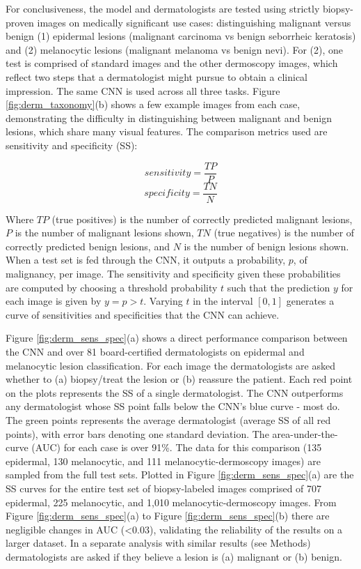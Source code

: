 For conclusiveness, the model and dermatologists are tested using strictly biopsy-proven images on medically significant use cases: distinguishing malignant versus benign (1) epidermal lesions (malignant carcinoma vs benign seborrheic keratosis) and (2) melanocytic lesions (malignant melanoma vs benign nevi). For (2), one test is comprised of standard images and the other dermoscopy images, which reflect two steps that a dermatologist might pursue to obtain a clinical impression. The same CNN is used across all three tasks. Figure \ref{fig:derm_taxonomy}(b) shows a few example images from each case, demonstrating the difficulty in distinguishing between malignant and benign lesions, which share many visual features. The comparison metrics used are sensitivity and specificity (SS):

$$sensitivity = \frac{TP}{P}$$
$$specificity = \frac{TN}{N}$$

Where $TP$ (true positives) is the number of correctly predicted malignant lesions, $P$ is the number of malignant lesions shown, $TN$ (true negatives) is the number of correctly predicted benign lesions, and $N$ is the number of benign lesions shown. When a test set is fed through the CNN, it outputs a probability, $p$, of malignancy, per image. The sensitivity and specificity given these probabilities are computed by choosing a threshold probability $t$ such that the prediction $y$ for each image is given by $y = p > t$. Varying $t$ in the interval $[0,1]$ generates a curve of sensitivities and specificities that the CNN can achieve.

Figure \ref{fig:derm_sens_spec}(a) shows a direct performance comparison between the CNN and over 81 board-certified dermatologists on epidermal and melanocytic lesion classification. For each image the dermatologists are asked whether to (a) biopsy/treat the lesion or (b) reassure the patient. Each red point on the plots represents the SS of a single dermatologist. The CNN outperforms any dermatologist whose SS point falls below the CNN’s blue curve - most do. The green points represents the average dermatologist (average SS of all red points), with error bars denoting one standard deviation. The area-under-the-curve (AUC) for each case is over 91\%. The data for this comparison (135 epidermal, 130 melanocytic, and 111 melanocytic-dermoscopy images) are sampled from the full test sets. Plotted in Figure \ref{fig:derm_sens_spec}(a) are the SS curves for the entire test set of biopsy-labeled images comprised of 707 epidermal, 225 melanocytic, and 1,010 melanocytic-dermoscopy images. From Figure \ref{fig:derm_sens_spec}(a) to Figure \ref{fig:derm_sens_spec}(b) there are negligible changes in AUC (<0.03), validating the reliability of the results on a larger dataset. In a separate analysis with similar results (see Methods) dermatologists are asked if they believe a lesion is (a) malignant or (b) benign.

